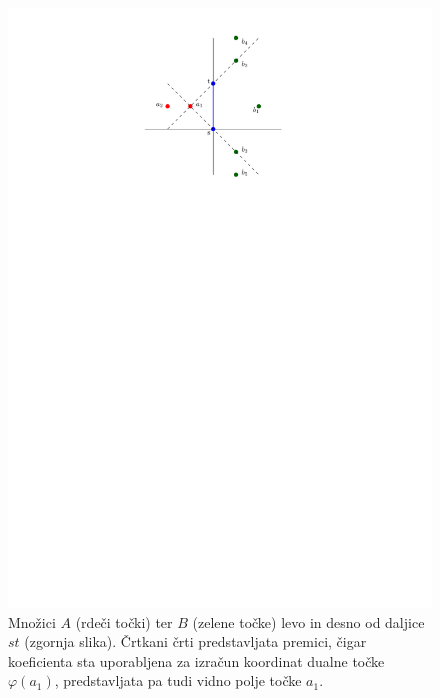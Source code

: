 \documentclass[a4paper, 12pt]{book}
\begin{document}
\begin{figure}
\centerline{\includegraphics[scale=1.2]{pics/dual_problem3.pdf}}
\caption{Množici $A$ (rdeči točki) ter $B$ (zelene točke) levo in desno od daljice $st$ (zgornja slika). Črtkani črti predstavljata premici, čigar koeficienta sta uporabljena za izračun koordinat dualne točke $\varphi (a_1)$, predstavljata pa tudi vidno polje točke $a_1$.} 
\label{dualp}
\end{figure}
\end{document}
